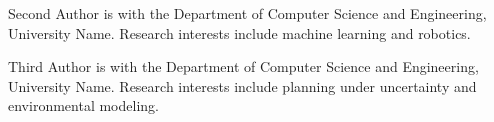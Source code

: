 \documentclass{ieeeaccess}
\begin{document}
\begin{IEEEbiography}{Second Author} is with the Department of Computer Science and Engineering, University Name. Research interests include machine learning and robotics.
\end{IEEEbiography}

\begin{IEEEbiography}{Third Author} is with the Department of Computer Science and Engineering, University Name. Research interests include planning under uncertainty and environmental modeling.
\end{IEEEbiography}

\EOD
\end{document}
